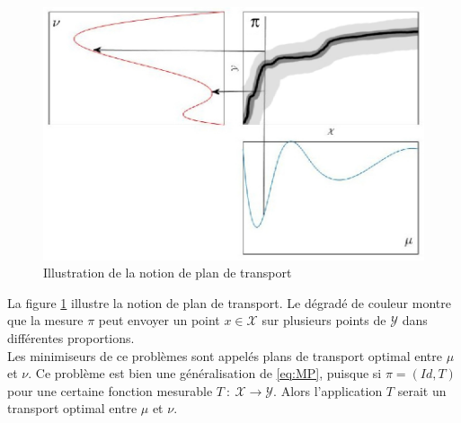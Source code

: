 \documentclass[a4paper,12pt]{article}
\begin{document}
\begin{figure}[!h]
\centering
\includegraphics[width=0.6\linewidth]{img/transport_plan2.jpg}
\caption{Illustration de la notion de plan de transport\label{fig:plantransp}}
\end{figure}
La figure \ref{fig:plantransp} illustre la notion de plan de transport. Le dégradé de couleur montre que la mesure $\pi$ peut envoyer un point $x\in\mathcal{X}$ sur plusieurs points de $\mathcal{Y}$ dans différentes proportions. \\

Les minimiseurs de ce problèmes sont appelés plans de transport optimal entre $\mu$ et $\nu$. Ce problème est bien une généralisation de \eqref{eq:MP}, puisque si $\pi = (Id,T)$ pour une certaine fonction mesurable $T\ :\ \mathcal{X}\rightarrow\mathcal{Y}$. Alors l'application $T$ serait un transport optimal entre $\mu$ et $\nu$. \\
\end{document}
